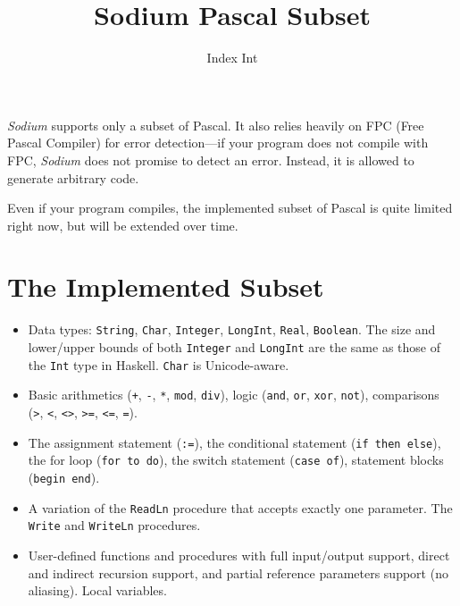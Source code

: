 \documentclass [a4paper] {article}
\title { Sodium Pascal Subset }
\author { Index Int }
\begin{document}
\maketitle

\lstset{language=Pascal}

\emph{Sodium} supports only a subset of Pascal. It also relies heavily on FPC
(Free Pascal Compiler) for error detection---if your program does not compile
with FPC, \emph{Sodium} does not promise to detect an error. Instead, it is
allowed to generate arbitrary code.

Even if your program compiles, the implemented subset of Pascal is quite limited
right now, but will be extended over time.

\section { The Implemented Subset }

\begin {itemize}

\item Data types: \texttt{String}, \texttt{Char}, \texttt{Integer},
\texttt{LongInt}, \texttt{Real}, \texttt{Boolean}. The size and lower/upper
bounds of both \texttt{Integer} and \texttt{LongInt} are the same as those of
the \texttt{Int} type in Haskell. \texttt{Char} is Unicode-aware.

\item Basic arithmetics (\texttt{+}, \texttt{-}, \texttt{*}, \texttt{mod},
\texttt{div}), logic (\texttt{and}, \texttt{or}, \texttt{xor}, \texttt{not}),
comparisons (\texttt{>}, \texttt{<}, \texttt{<>}, \texttt{>=}, \texttt{<=},
\texttt{=}).

\item The assignment statement (\texttt{:=}), the conditional statement
(\texttt{if then else}), the for loop (\texttt{for to do}), the switch statement
(\texttt{case of}), statement blocks (\texttt{begin end}).

\item A variation of the \texttt{ReadLn} procedure that accepts exactly one
parameter. The \texttt{Write} and \texttt{WriteLn} procedures.

\item User-defined functions and procedures with full input/output support,
direct and indirect recursion support, and partial reference parameters support
(no aliasing). Local variables.

\end {itemize}
\end{document}
